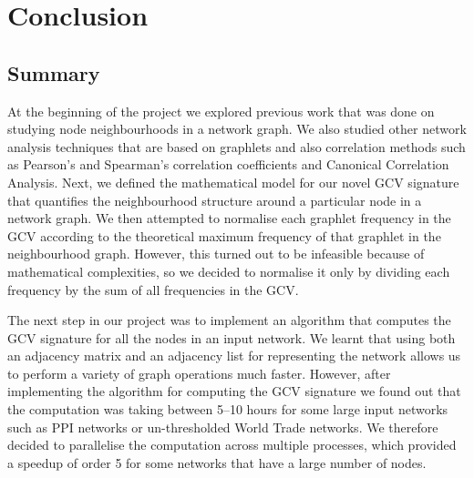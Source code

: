 \chapter{Conclusion}
\label{chp:conclusion}


\section{Summary}

At the beginning of the project we explored previous work that was done on studying node neighbourhoods in a network graph. We also studied other network analysis techniques that are based on graphlets and also correlation methods such as Pearson's and Spearman's correlation coefficients and Canonical Correlation Analysis. Next, we defined the mathematical model for our novel GCV signature that quantifies the neighbourhood structure around a particular node in a network graph. We then attempted to normalise each graphlet frequency in the GCV according to the theoretical maximum frequency of that graphlet in the neighbourhood graph. However, this turned out to be infeasible because of mathematical complexities, so we decided to normalise it only by dividing each frequency by the sum of all frequencies in the GCV. 

The next step in our project was to implement an algorithm that computes the GCV signature for all the nodes in an input network. We learnt that using both an adjacency matrix and an adjacency list for representing the network allows us to perform a variety of graph operations much faster. However, after implementing the algorithm for computing the GCV signature we found out that the computation was taking between 5--10 hours for some large input networks such as PPI networks or un-thresholded World Trade networks. We therefore decided to parallelise the computation across multiple processes, which provided a speedup of order 5 for some networks that have a large number of nodes.

